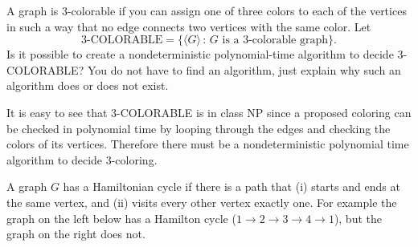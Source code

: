 \documentclass[12pt,answers]{exam}
\begin{document}
\begin{questions}
%
%


\question[8] A graph is 3-colorable if you can assign one of three colors to each of the vertices in such a way that no edge connects two vertices with the same color.  Let 
$$\text{3-COLORABLE} = \{ \langle G \rangle \, : \, G \text{ is a 3-colorable graph}\}.$$ 
Is it possible to create a nondeterministic polynomial-time algorithm to decide 3-COLORABLE? You do not have to find an algorithm, just explain why such an algorithm does or does not exist.
\begin{solution}
It is easy to see that 3-COLORABLE is in class NP since a proposed coloring can be checked in polynomial time by looping through the edges and checking the colors of its vertices.  Therefore there must be a nondeterministic polynomial time algorithm to decide 3-coloring. 
\end{solution}
\vfill
\vfill
\vfill

\newpage
\question[20] A graph $G$ has a Hamiltonian cycle if there is a path that (i) starts and ends at the same vertex, and (ii) visits every other vertex exactly one. For example the graph on the left below has a Hamilton cycle ($1 \rightarrow 2 \rightarrow 3 \rightarrow 4 \rightarrow 1$), but the graph on the right does not. 
\begin{center}
\end{center}
\end{questions}
\end{document}
